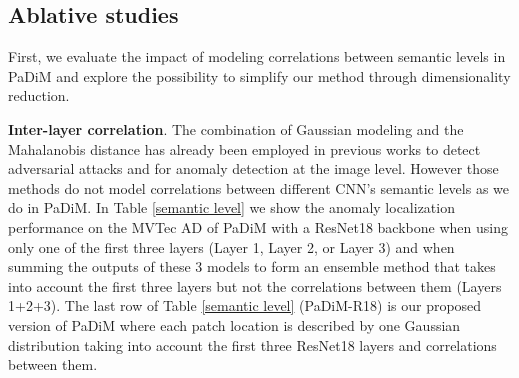 \documentclass[a4paper,conference]{IEEEtran}
\begin{document}
\subsection{Ablative studies}
First, we evaluate the impact of modeling correlations between semantic levels in PaDiM and explore the possibility to simplify our method through dimensionality reduction.
\label{Ablative study}


\textbf{Inter-layer correlation}. The combination of Gaussian modeling and the Mahalanobis distance has already been employed in previous works to detect adversarial attacks \cite{lee2018simple} and for anomaly detection \cite{rippel2020modeling} at the image level. However those methods do not model correlations between different CNN's semantic levels as we do in PaDiM. In Table \ref{semantic level} we show the anomaly localization performance on the MVTec AD of PaDiM with a ResNet18 backbone when using only one of the first three layers (Layer 1, Layer 2, or Layer 3) and  when summing the outputs of these 3 models to form an ensemble method that takes into account the first three layers but not the correlations between them (Layers 1+2+3). The last row of Table \ref{semantic level} (PaDiM-R18) is our proposed version of PaDiM where each patch location is described by one Gaussian distribution taking into account the first three ResNet18 layers and correlations between them.
\end{document}

